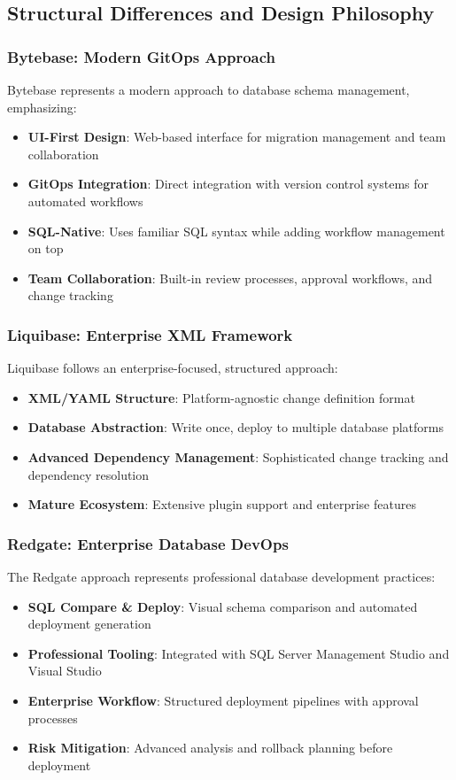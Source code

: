 \documentclass[11pt,a4paper]{article}
\begin{document}
\subsection{Structural Differences and Design Philosophy}

\subsubsection{Bytebase: Modern GitOps Approach}
Bytebase represents a modern approach to database schema management, emphasizing:
\begin{itemize}
\item \textbf{UI-First Design}: Web-based interface for migration management and team collaboration
\item \textbf{GitOps Integration}: Direct integration with version control systems for automated workflows
\item \textbf{SQL-Native}: Uses familiar SQL syntax while adding workflow management on top
\item \textbf{Team Collaboration}: Built-in review processes, approval workflows, and change tracking
\end{itemize}

\subsubsection{Liquibase: Enterprise XML Framework}
Liquibase follows an enterprise-focused, structured approach:
\begin{itemize}
\item \textbf{XML/YAML Structure}: Platform-agnostic change definition format
\item \textbf{Database Abstraction}: Write once, deploy to multiple database platforms
\item \textbf{Advanced Dependency Management}: Sophisticated change tracking and dependency resolution
\item \textbf{Mature Ecosystem}: Extensive plugin support and enterprise features
\end{itemize}

\subsubsection{Redgate: Enterprise Database DevOps}
The Redgate approach represents professional database development practices:
\begin{itemize}
\item \textbf{SQL Compare \& Deploy}: Visual schema comparison and automated deployment generation
\item \textbf{Professional Tooling}: Integrated with SQL Server Management Studio and Visual Studio
\item \textbf{Enterprise Workflow}: Structured deployment pipelines with approval processes
\item \textbf{Risk Mitigation}: Advanced analysis and rollback planning before deployment
\end{itemize}
\end{document}
